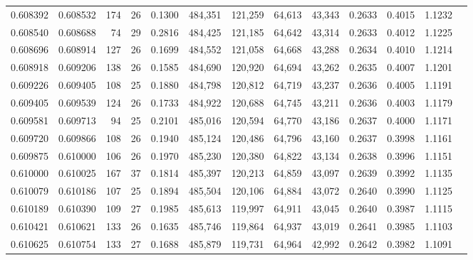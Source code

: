 \begin{tabular}{rrrrrrrrrrrrr}
0.608392 & 0.608532 &    174 &    26 &                                     0.1300 & 484,351 & 121,259 &  64,613 &  43,343 & 0.2633 & 0.4015 & 1.1232 \\
0.608540 & 0.608688 &     74 &    29 &                                     0.2816 & 484,425 & 121,185 &  64,642 &  43,314 & 0.2633 & 0.4012 & 1.1225 \\
0.608696 & 0.608914 &    127 &    26 &                                     0.1699 & 484,552 & 121,058 &  64,668 &  43,288 & 0.2634 & 0.4010 & 1.1214 \\
0.608918 & 0.609206 &    138 &    26 &                                     0.1585 & 484,690 & 120,920 &  64,694 &  43,262 & 0.2635 & 0.4007 & 1.1201 \\
0.609226 & 0.609405 &    108 &    25 &                                     0.1880 & 484,798 & 120,812 &  64,719 &  43,237 & 0.2636 & 0.4005 & 1.1191 \\
0.609405 & 0.609539 &    124 &    26 &                                     0.1733 & 484,922 & 120,688 &  64,745 &  43,211 & 0.2636 & 0.4003 & 1.1179 \\
0.609581 & 0.609713 &     94 &    25 &                                     0.2101 & 485,016 & 120,594 &  64,770 &  43,186 & 0.2637 & 0.4000 & 1.1171 \\
0.609720 & 0.609866 &    108 &    26 &                                     0.1940 & 485,124 & 120,486 &  64,796 &  43,160 & 0.2637 & 0.3998 & 1.1161 \\
0.609875 & 0.610000 &    106 &    26 &                                     0.1970 & 485,230 & 120,380 &  64,822 &  43,134 & 0.2638 & 0.3996 & 1.1151 \\
0.610000 & 0.610025 &    167 &    37 &                                     0.1814 & 485,397 & 120,213 &  64,859 &  43,097 & 0.2639 & 0.3992 & 1.1135 \\
0.610079 & 0.610186 &    107 &    25 &                                     0.1894 & 485,504 & 120,106 &  64,884 &  43,072 & 0.2640 & 0.3990 & 1.1125 \\
0.610189 & 0.610390 &    109 &    27 &                                     0.1985 & 485,613 & 119,997 &  64,911 &  43,045 & 0.2640 & 0.3987 & 1.1115 \\
0.610421 & 0.610621 &    133 &    26 &                                     0.1635 & 485,746 & 119,864 &  64,937 &  43,019 & 0.2641 & 0.3985 & 1.1103 \\
0.610625 & 0.610754 &    133 &    27 &                                     0.1688 & 485,879 & 119,731 &  64,964 &  42,992 & 0.2642 & 0.3982 & 1.1091 \\

\end{tabular}
